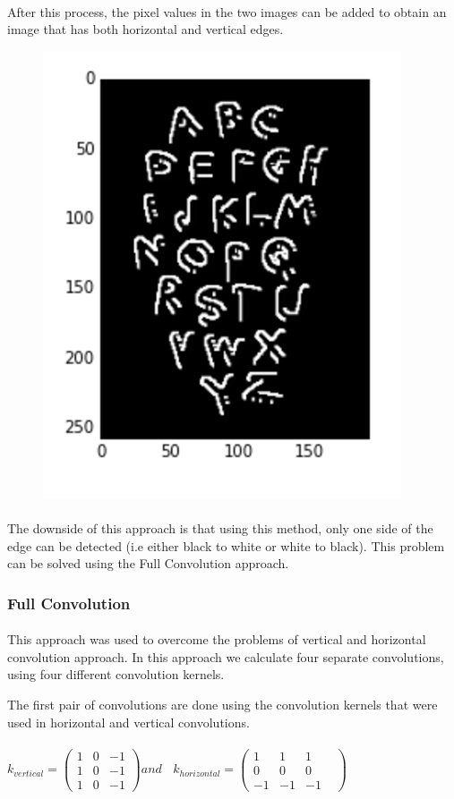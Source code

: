 \documentclass{article}
\begin{document}
		\paragraph{}
		After this process, the pixel values in the two images can be added to obtain an image that has both horizontal and vertical edges.

		\begin{figure}[H]
			\center
			\includegraphics[width=0.3\linewidth]{images/horizontal_and_vertical.png}
			\label{fig:text6}
		\end{figure}

		\paragraph{}
		The downside of this approach is that using this method, only one side of the edge can be detected (i.e either black to white or white to black). This problem can be solved using the Full Convolution approach.\\
		\subsubsection{Full Convolution}

		\paragraph{}
		This approach was used to overcome the problems of vertical and horizontal convolution approach. In this approach we calculate four separate convolutions, using four different convolution kernels.

		The first pair of convolutions are done using the convolution kernels that were used in horizontal and vertical convolutions. \\ \\
		$k_{vertical} = 
		\left(
		\begin{matrix}
		1 & 0 & -1 \\
		1 & 0 & -1 \\
		1 & 0 & -1
		\end{matrix}
		\right) 
		and\ \ \ \ 
		k_{horizontal} = 
		\left(
		\begin{matrix}
		 1&   1&   1& \\
		 0&   0&   0& \\
		-1&  -1&  -1&
		\end{matrix}
		\right)
		$
\end{document}
